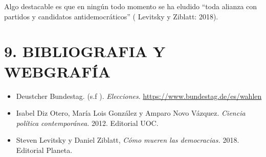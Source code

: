 \documentclass[
]{article}
\begin{document}
Algo destacable es que en ningún todo momento se ha eludido ``toda
alianza con partidos y candidatos antidemocráticos'' ( Levitsky y
Ziblatt: 2018).

\hypertarget{bibliografia-y-webgrafuxeda}{%
\section{9. BIBLIOGRAFIA Y
WEBGRAFÍA}\label{bibliografia-y-webgrafuxeda}}

\begin{itemize}
\item
  Deustcher Bundestag. (s.f ). \emph{Elecciones}.
  \url{https://www.bundestag.de/es/wahlen}
\item
  Isabel Diz Otero, María Lois González y Amparo Novo Vázquez.
  \emph{Ciencia política contemporánea.} 2012. Editorial UOC.
\item
  Steven Levitsky y Daniel Ziblatt, \emph{Cómo mueren las democracias.}
  2018. Editorial Planeta.
\end{itemize}
\end{document}
